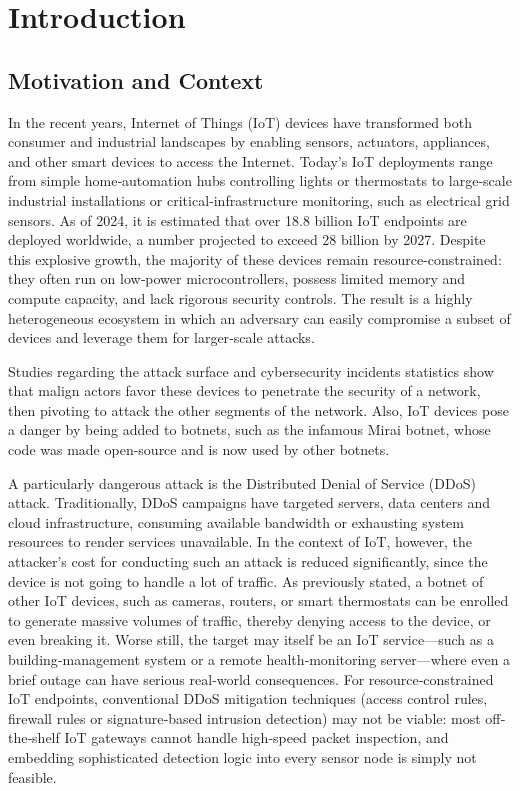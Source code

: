 \chapter{Introduction}
\label{chap:intro}
\section{Motivation and Context}
In the recent years, Internet of Things (IoT) devices have transformed both consumer and industrial landscapes by  enabling sensors, actuators, appliances, and other smart devices to access the Internet. Today’s IoT deployments range from simple home‐automation hubs controlling lights or thermostats to large‐scale industrial installations or critical‐infrastructure monitoring, such as electrical grid sensors. As of 2024, it is estimated that over 18.8 billion IoT endpoints are deployed worldwide, a number projected to exceed 28 billion by 2027\cite{iotanalytics2024}. Despite this explosive growth, the majority of these devices remain resource‐constrained: they often run on low‐power microcontrollers, possess limited memory and compute capacity, and lack rigorous security controls\cite{sh_selvaraj2023}. The result is a highly heterogeneous ecosystem in which an adversary can easily compromise a subset of devices and leverage them for larger‐scale attacks\cite{sh_xenofontos2022}.

Studies regarding the attack surface and cybersecurity incidents statistics\cite{iot_vulnerable1}\cite{iot_vulnerable2} show that malign actors favor these devices to penetrate the security of a network, then pivoting to attack the other segments of the network\cite{iot_vulnerable2}. Also, IoT devices pose a danger by being added to botnets, such as the infamous Mirai botnet\cite{iot_vulnerable1}, whose code was made open-source and is now used by other botnets.

A particularly dangerous attack is the Distributed Denial of Service (DDoS) attack. Traditionally, DDoS campaigns have targeted servers, data centers and cloud infrastructure, consuming available bandwidth or exhausting system resources to render services unavailable. In the context of IoT, however, the attacker’s cost for conducting such an attack is reduced significantly, since the device is not going to handle a lot of traffic. As previously  stated, a botnet of other IoT devices, such as cameras, routers, or smart thermostats can be enrolled to generate massive volumes of traffic, thereby denying access to the device, or even breaking it. Worse still, the target may itself be an IoT service—such as a building‐management system or a remote health‐monitoring server—where even a brief outage can have serious real‐world consequences. For resource‐constrained IoT endpoints, conventional DDoS mitigation techniques (access control rules, firewall rules or signature‐based intrusion detection) may not be viable: most off‐the‐shelf IoT gateways cannot handle high‐speed packet inspection, and embedding sophisticated detection logic into every sensor node is simply not feasible.

